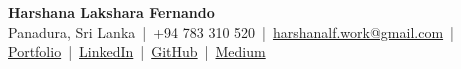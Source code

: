 % 


\begin{center} 
    {\fontsize{20}{24}\bfseries Harshana Lakshara Fernando}\\[3pt] 
    \small 
    Panadura, Sri Lanka \,|\, +94 783 310 520 \,|\,  
    \href{mailto:harshanalf.work@gmail.com}{harshanalf.work@gmail.com} \,|\,  
    \href{https://harshanalf.netlify.app/portfolio}{Portfolio} \,|\,  
    \href{https://www.linkedin.com/in/harshana-lakshara/}{LinkedIn} \,|\,  
    \href{https://github.com/UchihaIthachi}{GitHub} \,|\,  
    \href{https://medium.com/@HarshanaLF}{Medium} 
\end{center} 
\vspace{-0.6em}
